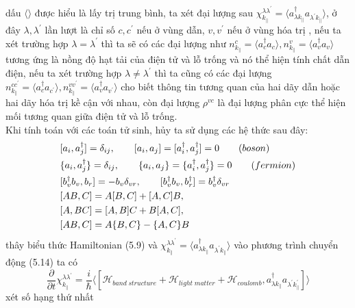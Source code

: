 dấu $\langle\rangle$ được hiểu là lấy trị trung bình, ta xét đại lượng sau $\chi_{k_{\parallel}}^{\lambda\lambda^{'}}=\langle a_{\lambda k_{\parallel}}^{\dagger}a_{\lambda^{'} k_{\parallel}}\rangle$, ở đây $\lambda,\lambda^{'}$ lần lượt là chỉ số $c,c^{'}$ nếu ở vùng dẫn, $v,v^{'}$ nếu ở vùng hóa trị , nếu ta xét trường hợp $\lambda=\lambda^{'}$ thì ta sẽ có các đại lượng như $n_{k_{\parallel}}^{c} = \langle a_c^{\dagger}a_c\rangle,n_{k_{\parallel}}^{v} = \langle a_v^{\dagger}a_v\rangle$ tương ứng là nồng độ hạt tải của điện tử và lỗ trống và nó thể hiện tính chất dẫn điện, nếu ta xét trường hợp $\lambda\neq\lambda^{'}$ thì ta cũng có các đại lượng $n_{k_{\parallel}}^{cc^{'}} = \langle a_c^{\dagger}a_{c^{'}}\rangle,n_{k_{\parallel}}^{vv^{'}} = \langle a_v^{\dagger}a_{v^{'}}\rangle$ cho biết thông tin tương quan của hai dãy dẫn hoặc hai dãy hóa trị kề cận với nhau, còn đại lượng $\rho^{vc}$ là đại lượng phân cực thể hiện mối tương quan giữa điện tử và lỗ trống.\\
Khi tính toán với các toán tử sinh, hủy ta sử dụng các hệ thức sau đây:
\begin{align}
&[a_i,a_j^{\dagger}]= \delta_{ij},\qquad[a_i,a_j]=[a_i^{\dagger},a_j^{\dagger}]=0 \qquad (boson)\notag\\
&\{a_i,a_j^{\dagger}\}= \delta_{ij},\qquad \{a_i,a_j\}=\{a_i^{\dagger},a_j^{\dagger}\}=0 \qquad (fermion)\notag\\
&[b_v^{\dagger}b_v,b_r] =-b_v\delta_{vr},\qquad [b_v^{\dagger}b_v,b_r^{\dagger}]=b_v^{\dagger}\delta_{vr}\notag\\
&[AB,C]=A[B,C] +[A,C]B,\notag\\
&[A,BC]=[A,B]C+B[A,C],\notag\\
&[AB,C]=A\{B,C\}-\{A,C\}B
\end{align}
thây biểu thức Hamiltonian (5.9) và $\chi_{k_{\parallel}}^{\lambda\lambda^{'}}=\langle a_{\lambda k_{\parallel}}^{\dagger}a_{\lambda^{'} k_{\parallel}}\rangle$ vào phương trình chuyển động (5.14) ta có
\begin{equation}
\frac{\partial}{\partial t}\chi_{k_{\parallel}}^{\lambda\lambda^{'}} =\frac{i}{\hbar}\langle[\mathcal{H}_{band \;structure} +\mathcal{H}_{light\;matter} +\mathcal{H}_{coulomb},a_{\lambda k_{\parallel}}^{\dagger}a_{\lambda^{'} k_{\parallel}^{'}}]\rangle
\end{equation}
xét số hạng thứ nhất 
